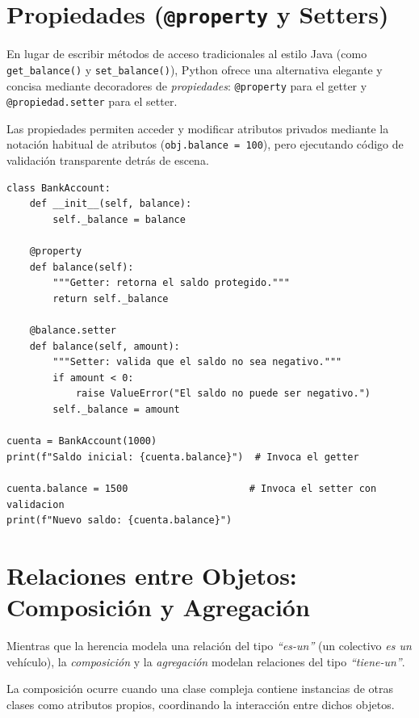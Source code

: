 \section{Propiedades (\texttt{@property} y Setters)}
En lugar de escribir métodos de acceso tradicionales al estilo Java (como \texttt{get\_balance()} y \texttt{set\_balance()}),
Python ofrece una alternativa elegante y concisa mediante decoradores de \textit{propiedades}: \texttt{@property} para el getter
y \texttt{@propiedad.setter} para el setter.

Las propiedades permiten acceder y modificar atributos privados mediante la notación habitual de atributos (\texttt{obj.balance = 100}),
pero ejecutando código de validación transparente detrás de escena.

\begin{lstlisting}[caption={Uso de \texttt{@property} para validar la asignación de saldo.}, label={list:property_setter}]
class BankAccount:
    def __init__(self, balance):
        self._balance = balance

    @property
    def balance(self):
        """Getter: retorna el saldo protegido."""
        return self._balance

    @balance.setter
    def balance(self, amount):
        """Setter: valida que el saldo no sea negativo."""
        if amount < 0:
            raise ValueError("El saldo no puede ser negativo.")
        self._balance = amount

cuenta = BankAccount(1000)
print(f"Saldo inicial: {cuenta.balance}")  # Invoca el getter

cuenta.balance = 1500                     # Invoca el setter con validacion
print(f"Nuevo saldo: {cuenta.balance}")
\end{lstlisting}

\section{Relaciones entre Objetos: Composición y Agregación}
Mientras que la herencia modela una relación del tipo \textit{``es-un''} (un colectivo \textit{es un} vehículo),
la \textit{composición} y la \textit{agregación} modelan relaciones del tipo \textit{``tiene-un''}.

La composición ocurre cuando una clase compleja contiene instancias de otras clases como atributos propios,
coordinando la interacción entre dichos objetos.

